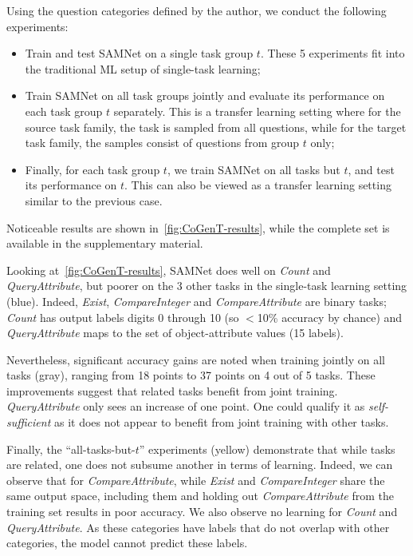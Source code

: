 Using the question categories defined by the author, we conduct the following experiments:
\begin{itemize}
	\compresslist
	\item Train and test SAMNet on a single task group $t$. These 5 experiments fit into the traditional ML setup of single-task learning;
	\item Train SAMNet on all task groups jointly and evaluate its performance on each task group $t$ separately.
	This is a transfer learning setting where for the source task family, the task is sampled from all questions, while for the target task family, the samples consist of questions from group $t$ only;
	\item Finally, for each task group $t$, we train SAMNet on all tasks but $t$, and test its performance on $t$. This can also be viewed as a transfer learning setting similar to the previous case.
\end{itemize}

Noticeable results are shown in~\cref{fig:CoGenT-results}, while the complete set is available in the supplementary material.

Looking at~\cref{fig:CoGenT-results}, SAMNet does well on \textit{Count} and \textit{QueryAttribute}, but poorer on the 3 other tasks in the single-task learning setting (blue). Indeed, \textit{Exist}, \textit{CompareInteger} and \textit{CompareAttribute} are binary tasks; \textit{Count} has output labels digits 0 through 10 (so $<$10\% accuracy by chance) and \textit{QueryAttribute} maps to the set of object-attribute values (15 labels).

Nevertheless, significant accuracy gains are noted when training jointly on all tasks (gray), ranging from 18 points to 37 points on 4 out of 5 tasks. These improvements suggest that related tasks benefit from joint training. \textit{QueryAttribute} only sees an increase of one point. One could qualify it as \textit{self-sufficient} as it does not appear to benefit from joint training with other tasks.

Finally, the ``all-tasks-but-$t$'' experiments (yellow) demonstrate that while tasks are related, one does not subsume another in terms of learning. Indeed, we can observe that for \textit{CompareAttribute}, while \textit{Exist} and \textit{CompareInteger} share the same output space, including them and holding out \textit{CompareAttribute} from the training set results in poor accuracy.
We also observe no learning for \textit{Count} and \textit{QueryAttribute}. As these categories have labels that do not overlap with other categories, the model cannot predict these labels.

